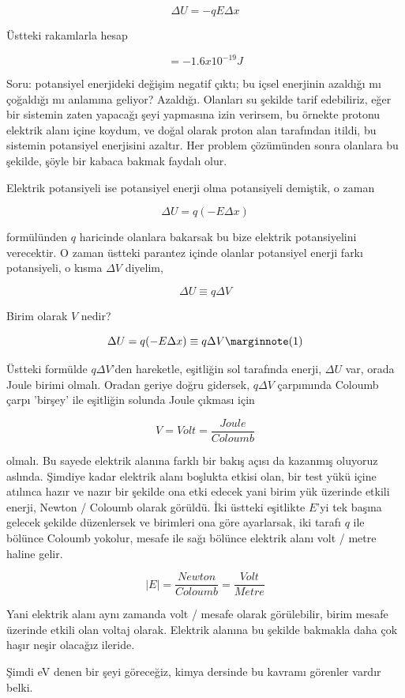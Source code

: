 \documentclass[12pt,fleqn]{article}\usepackage{../../common}
\begin{document}
$$
\Delta U = -q E \Delta x
$$

Üstteki rakamlarla hesap

$$
= -1.6 x 10^{-19} J
$$

Soru: potansiyel enerjideki değişim negatif çıktı; bu içsel enerjinin azaldığı
mı çoğaldığı mı anlamına geliyor? Azaldığı. Olanları su şekilde tarif
edebiliriz, eğer bir sistemin zaten yapacağı şeyi yapmasına izin verirsem, bu
örnekte protonu elektrik alanı içine koydum, ve doğal olarak proton alan
tarafından itildi, bu sistemin potansiyel enerjisini azaltır. Her problem
çözümünden sonra olanlara bu şekilde,  şöyle bir kabaca bakmak faydalı olur. 

Elektrik potansiyeli ise potansiyel enerji olma potansiyeli demiştik, o zaman

$$
\Delta U = q (-E \Delta x ) 
$$

formülünden $q$ haricinde olanlara bakarsak bu bize elektrik potansiyelini
verecektir. O zaman üstteki parantez içinde olanlar potansiyel enerji farkı
potansiyeli, o kısma $\Delta V$ diyelim,

$$
\Delta U \equiv q \Delta V
$$

Birim olarak $V$ nedir? 

$$
\Delta U = q (-E \Delta x )  \equiv q \Delta V 
\mlabel{1}
$$

Üstteki formülde $q \Delta V$'den hareketle, eşitliğin sol tarafında enerji,
$\Delta U$ var, orada Joule birimi olmalı. Oradan geriye doğru gidersek, $q
\Delta V$ çarpımında Coloumb çarpı 'birşey' ile eşitliğin solunda Joule çıkması
için 

$$
V = Volt = \frac{Joule}{Coloumb}
$$

olmalı. Bu sayede elektrik alanına farklı bir bakış açısı da kazanmış oluyoruz
aslında. Şimdiye kadar elektrik alanı boşlukta etkisi olan, bir test yükü içine
atılınca hazır ve nazır bir şekilde ona etki edecek yani birim yük üzerinde
etkili enerji, Newton / Coloumb olarak görüldü. İki üstteki eşitlikte $E$'yi tek
başına gelecek şekilde düzenlersek ve birimleri ona göre ayarlarsak, iki tarafı
$q$ ile bölünce Coloumb yokolur, mesafe ile sağı bölünce elektrik alanı volt /
metre haline gelir.

$$
|E| = \frac{Newton}{Coloumb} = \frac{Volt}{Metre}
$$

Yani elektrik alanı aynı zamanda volt / mesafe olarak görülebilir, birim mesafe
üzerinde etkili olan voltaj olarak. Elektrik alanına bu şekilde bakmakla daha
çok haşır neşir olacağız ileride.

Şimdi eV denen bir şeyi göreceğiz, kimya dersinde bu kavramı görenler vardır
belki. 
\end{document}
